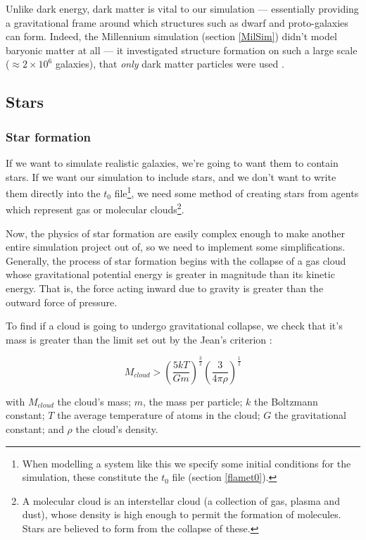 \documentclass[11pt,a4paper]{article}
\begin{document}
Unlike dark energy, dark matter is vital to our simulation --- essentially providing a gravitational frame around which structures such as dwarf and proto-galaxies can form. Indeed, the Millennium simulation (section \ref{MilSim}) didn't model baryonic matter at all --- it investigated structure formation on such a large scale ($\approx 2\times 10^6$ galaxies), that \emph{only} dark matter particles were used \cite{millenium}.

\subsection{Stars}
\subsubsection{Star formation}
If we want to simulate realistic galaxies, we're going to want them to contain stars. If we want our simulation to include stars, and we don't want to write them directly into the $t_{0}$ file\footnote{When modelling a system like this we specify some initial conditions for the simulation, these constitute the $t_0$ file (section \ref{flamet0}).}, we need some method of creating stars from agents which represent gas or molecular clouds\footnote{A molecular cloud is an interstellar cloud (a collection of gas, plasma and dust), whose density is high enough to permit the formation of molecules. Stars are believed to form from the collapse of these.}. 

Now, the physics of star formation are easily complex enough to make another entire simulation project out of, so we need to implement some simplifications. Generally, the process of star formation begins with the collapse of a gas cloud whose gravitational potential energy is greater in magnitude than its kinetic energy. That is, the force acting inward due to gravity is greater than the outward force of pressure.

\label{jean}
To find if a cloud is going to undergo gravitational collapse, we check that it's mass is greater than the limit set out by the Jean's criterion \cite{jean}:

\begin{equation}
M_{cloud} > (\frac{5kT}{Gm})^\frac{3}{2}(\frac{3}{4\pi\rho})^\frac{1}{2}
\end{equation}

\noindent with $M_{cloud}$ the cloud's mass; $m$, the mass per particle; $k$ the Boltzmann constant; $T$ the average temperature of atoms in the cloud; $G$ the gravitational constant; and $\rho$ the cloud's density.
\end{document}
